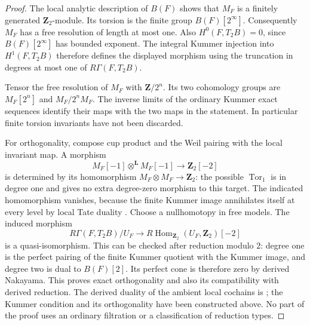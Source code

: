 \begin{proof}
The local analytic description of $B(F)$ shows that $M_F$ is a finitely
generated $\mathbf Z_2$-module.  Its torsion is the finite group
$B(F)[2^\infty]$.  Consequently $M_F$ has a free resolution of length at
most one.  Also $H^0(F,T_2B)=0$, since $B(F)[2^\infty]$ has bounded
exponent.  The integral Kummer injection into $H^1(F,T_2B)$ therefore
defines the displayed morphism using the truncation in degrees at most
one of $R\Gamma(F,T_2B)$.

Tensor the free resolution of $M_F$ with $\mathbf Z/2^n$.  Its two
cohomology groups are $M_F[2^n]$ and $M_F/2^nM_F$.  The inverse limits of
the ordinary Kummer exact sequences identify their maps with the two
maps in the statement.  In particular finite torsion invariants have not
been discarded.

For orthogonality, compose cup product and the Weil pairing with the local
invariant map.  A morphism
\[
 M_F[-1]\otimes^{\mathbf L}M_F[-1]
       \longrightarrow\mathbf Z_2[-2]
\]
is determined by its homomorphism $M_F\otimes M_F\to\mathbf Z_2$:
the possible $\operatorname{Tor}_1$ is in degree one and gives no extra
degree-zero morphism to this target.  The indicated homomorphism vanishes,
because the finite Kummer image annihilates itself at every level by local
Tate duality \cite[I, Theorem~3.2 and Corollary~3.4]{MilneADT2006}.
Choose a nullhomotopy in free models.  The induced morphism
\[
 R\Gamma(F,T_2B)/U_F
       \longrightarrow R\operatorname{Hom}_{\mathbf Z_2}
                         (U_F,\mathbf Z_2)[-2]
\]
is a quasi-isomorphism.  This can be checked after reduction modulo $2$:
degree one is the perfect pairing of the finite Kummer quotient with the
Kummer image, and degree two is dual to $B(F)[2]$.  Its perfect cone is
therefore zero by derived Nakayama.  This proves exact orthogonality and
also its compatibility with derived reduction.  The derived duality of
the ambient local cochains is \cite[Proposition~5.2.4]{Nekovar2006};
the Kummer condition and its orthogonality have been constructed above.
No part of the proof uses an ordinary filtration or a classification of
reduction types.
\end{proof}

